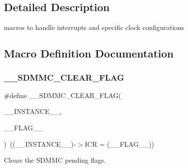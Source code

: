 \subsection{Detailed Description}
macros to handle interrupts and specific clock configurations 



\subsection{Macro Definition Documentation}
\mbox{\label{group___s_d_m_m_c___l_l___interrupt___clock_ga1f35f651980bee563bd9c7d00052cdc8}} 
\subsubsection{\texorpdfstring{\_\_SDMMC\_CLEAR\_FLAG}{\_\_SDMMC\_CLEAR\_FLAG}}
{\footnotesize\ttfamily \#define \+\_\+\+\_\+\+S\+D\+M\+M\+C\+\_\+\+C\+L\+E\+A\+R\+\_\+\+F\+L\+AG(\begin{DoxyParamCaption}\item[{}]{\+\_\+\+\_\+\+I\+N\+S\+T\+A\+N\+C\+E\+\_\+\+\_\+,  }\item[{}]{\+\_\+\+\_\+\+F\+L\+A\+G\+\_\+\+\_\+ }\end{DoxyParamCaption})~((\+\_\+\+\_\+\+I\+N\+S\+T\+A\+N\+C\+E\+\_\+\+\_\+)-\/$>$I\+CR = (\+\_\+\+\_\+\+F\+L\+A\+G\+\_\+\+\_\+))}



Clears the S\+D\+M\+MC pending flags. 


